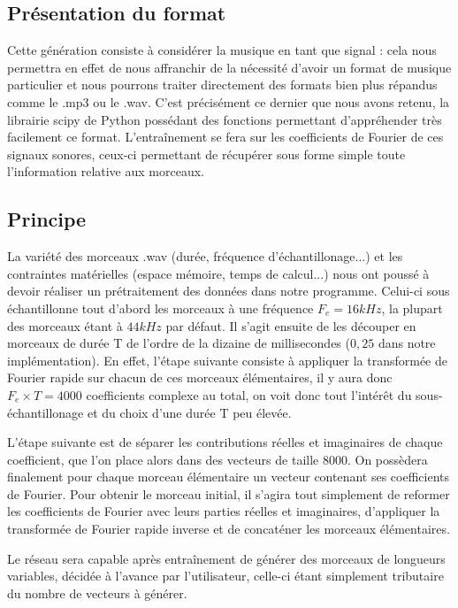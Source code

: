 \subsection{Présentation du format}
Cette génération consiste à considérer la musique en tant que signal : cela nous permettra en effet de nous affranchir de la nécessité d'avoir un format de musique particulier et nous pourrons traiter directement des formats bien plus répandus comme le .mp3 ou le .wav. C'est précisément ce dernier que nous avons retenu, la librairie scipy de Python possédant des fonctions permettant d'appréhender très facilement ce format. L'entraînement se fera sur les coefficients de Fourier de ces signaux sonores, ceux-ci permettant de récupérer sous forme simple toute l'information relative aux morceaux.

\subsection{Principe}
La variété des morceaux .wav (durée, fréquence d'échantillonage...) et les contraintes matérielles (espace mémoire, temps de calcul...) nous ont poussé à devoir réaliser un prétraitement des données dans notre programme. Celui-ci sous échantillonne tout d'abord les morceaux à une fréquence $F_e = 16kHz$, la plupart des morceaux étant à $44kHz$ par défaut. Il s'agit ensuite de les découper en morceaux de durée T de l'ordre de la dizaine de millisecondes ($0,25$ dans notre implémentation). En effet, l'étape suivante consiste à appliquer la transformée de Fourier rapide sur chacun de ces morceaux élémentaires, il y aura donc $F_e \times T = 4000$ coefficients complexe au total, on voit donc tout l'intérêt du sous-échantillonage et du choix d'une durée T peu élevée. 

L'étape suivante est de séparer les contributions réelles et imaginaires de chaque coefficient, que l'on place alors dans des vecteurs de taille 8000. On possèdera finalement pour chaque morceau élémentaire un vecteur contenant ses coefficients de Fourier. Pour obtenir le morceau initial, il s'agira tout simplement de reformer les coefficients de Fourier avec leurs parties réelles et imaginaires, d'appliquer la transformée de Fourier rapide inverse et de concaténer les morceaux élémentaires.

Le réseau sera capable après entraînement de générer des morceaux de longueurs variables, décidée à l'avance par l'utilisateur, celle-ci étant simplement tributaire du nombre de vecteurs à générer.

